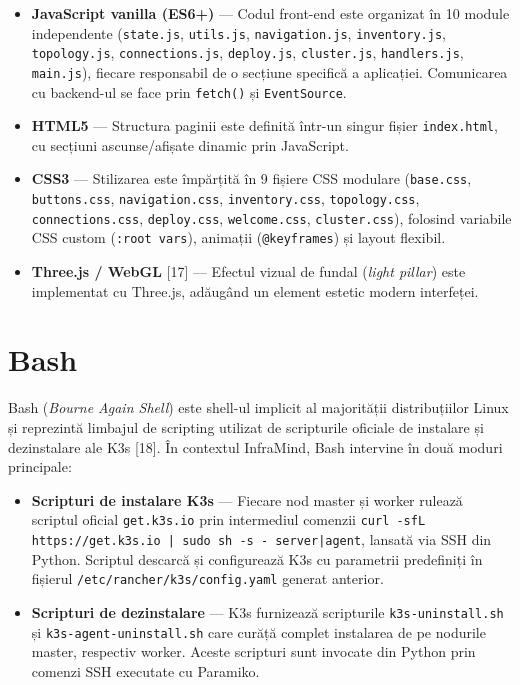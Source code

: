 \documentclass[12pt,a4paper]{report}
\begin{document}
\begin{itemize}
  \item \textbf{JavaScript vanilla (ES6+)} — Codul front-end este organizat în 10 module independente (\texttt{state.js}, \texttt{utils.js}, \texttt{navigation.js}, \texttt{inventory.js}, \texttt{topology.js}, \texttt{connections.js}, \texttt{deploy.js}, \texttt{cluster.js}, \texttt{handlers.js}, \texttt{main.js}), fiecare responsabil de o secțiune specifică a aplicației. Comunicarea cu backend-ul se face prin \texttt{fetch()} și \texttt{EventSource}.
  \item \textbf{HTML5} — Structura paginii este definită într-un singur fișier \texttt{index.html}, cu secțiuni ascunse/afișate dinamic prin JavaScript.
  \item \textbf{CSS3} — Stilizarea este împărțită în 9 fișiere CSS modulare (\texttt{base.css}, \texttt{buttons.css}, \texttt{navigation.css}, \texttt{inventory.css}, \texttt{topology.css}, \texttt{connections.css}, \texttt{deploy.css}, \texttt{welcome.css}, \texttt{cluster.css}), folosind variabile CSS custom (\texttt{:root vars}), animații (\texttt{@keyframes}) și layout flexibil.
  \item \textbf{Three.js / WebGL} [17] — Efectul vizual de fundal (\textit{light pillar}) este implementat cu Three.js, adăugând un element estetic modern interfeței.
\end{itemize}

\section{Bash}

Bash (\textit{Bourne Again Shell}) este shell-ul implicit al majorității distribuțiilor Linux și reprezintă limbajul de scripting utilizat de scripturile oficiale de instalare și dezinstalare ale K3s [18]. În contextul InfraMind, Bash intervine în două moduri principale:

\begin{itemize}
  \item \textbf{Scripturi de instalare K3s} — Fiecare nod master și worker rulează scriptul oficial \texttt{get.k3s.io} prin intermediul comenzii \texttt{curl -sfL https://get.k3s.io | sudo sh -s - server|agent}, lansată via SSH din Python. Scriptul descarcă și configurează K3s cu parametrii predefiniți în fișierul \texttt{/etc/rancher/k3s/config.yaml} generat anterior.
  \item \textbf{Scripturi de dezinstalare} — K3s furnizează scripturile \texttt{k3s-uninstall.sh} și \texttt{k3s-agent-uninstall.sh} care curăță complet instalarea de pe nodurile master, respectiv worker. Aceste scripturi sunt invocate din Python prin comenzi SSH executate cu Paramiko.
\end{itemize}
\end{document}
